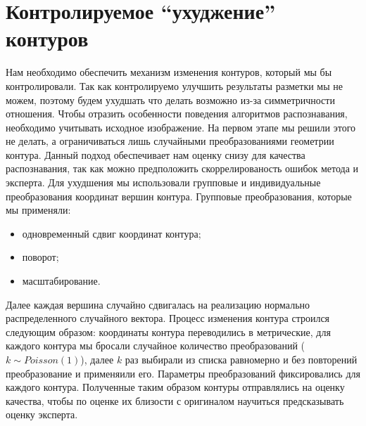 \documentclass[12pt]{article}
\begin{document}
\section{Контролируемое ``ухуджение'' контуров}
\label{morphing}
Нам необходимо обеспечить механизм изменения контуров, который мы бы контролировали. Так как контролируемо улучшить результаты разметки мы не можем, поэтому будем ухудшать что делать возможно из-за симметричности отношения. Чтобы отразить особенности поведения алгоритмов распознавания, необходимо учитывать исходное изображение. На первом этапе мы решили этого не делать, а ограничиваться лишь случайными преобразованиями геометрии контура. Данный подход обеспечивает нам оценку снизу для качества распознавания, так как можно предположить скоррелированость ошибок метода и эксперта. Для ухудшения мы использовали групповые и индивидуальные преобразования координат вершин контура. Групповые преобразования, которые мы применяли:
\begin{itemize}
	\item одновременный сдвиг координат контура;
	\item поворот;
	\item масштабирование.
\end{itemize}
Далее каждая вершина случайно сдвигалась на реализацию нормально распределенного случайного вектора. Процесс изменения контура строился следующим образом: координаты контура переводились в метрические, для каждого контура мы бросали случайное количество преобразований ($k \sim Poisson(1)$), далее $k$ раз выбирали из списка равномерно и без повторений преобразование и применяили его. Параметры преобразований фиксировались для каждого контура. Полученные таким образом контуры отправлялись на оценку качества, чтобы по оценке их близости с оригиналом научиться предсказывать оценку эксперта.
\end{document}
